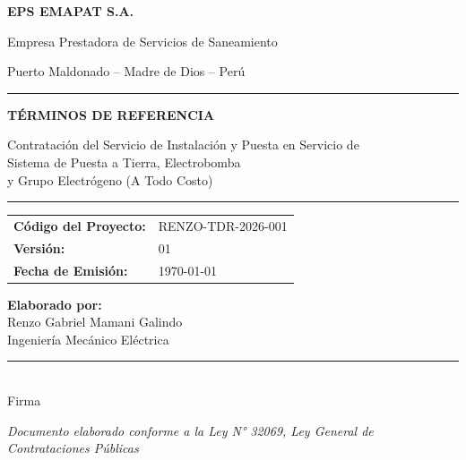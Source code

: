 \documentclass[12pt,a4paper]{article}
\begin{document}
\begin{titlepage}
\begin{center}
\vspace*{0.5cm}

{\large\textbf{EPS EMAPAT S.A.}}

\vspace{0.3cm}
{\small Empresa Prestadora de Servicios de Saneamiento}

\vspace{0.3cm}
{\small Puerto Maldonado -- Madre de Dios -- Perú}

\vspace{1.5cm}

\rule{\textwidth}{1.5pt}

\vspace{0.5cm}
{\LARGE\bfseries\color{navyblue} TÉRMINOS DE REFERENCIA}

\vspace{0.3cm}
{\Large Contratación del Servicio de Instalación y Puesta en Servicio de\\
Sistema de Puesta a Tierra, Electrobomba\\
y Grupo Electrógeno (A Todo Costo)}

\vspace{0.3cm}
\rule{\textwidth}{1.5pt}

\vspace{1.5cm}

\begin{tabular}{ll}
\textbf{Código del Proyecto:} & RENZO-TDR-2026-001 \\
\textbf{Versión:} & 01 \\
\textbf{Fecha de Emisión:} & \today \\
\end{tabular}

\vspace{1.5cm}

\begin{flushleft}
\small
\textbf{Elaborado por:} \\
Renzo Gabriel Mamani Galindo \\
Ingeniería Mecánico Eléctrica \\
\rule{4cm}{0.4pt} \\
Firma
\end{flushleft}

\vfill
{\small \textit{Documento elaborado conforme a la Ley N° 32069, Ley General de Contrataciones Públicas}}
\end{center}
\end{titlepage}
\end{document}
